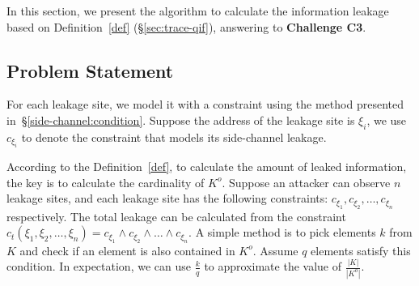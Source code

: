 

\newcommand{\addr}[1]{{l}_{#1}}
\renewcommand{\addr}[1]{{\gamma}_{#1}}
\renewcommand{\addr}[1]{{\zeta}_{#1}}
\renewcommand{\addr}[1]{{\xi}_{#1}}

In this section, we present the algorithm to calculate the information leakage
based on Definition~\ref{def} (\S\ref{sec:trace-qif}), answering to
\textbf{Challenge C3}.

\subsection{Problem Statement}
For each leakage site, we model it with a constraint using the
method presented in~\S\ref{side-channel:condition}. Suppose the address of the
leakage site is $\addr{i}$, we use $c_{\addr{i}}$ to denote the constraint
that models its side-channel leakage. 

According to the Definition~\ref{def}, to calculate the amount of leaked
information, the key is to calculate the cardinality
of $K^o$. Suppose an attacker can observe $n$ leakage sites, and each leakage
site has the following constraints: $c_{\addr{1}}, c_{\addr{2}}, \ldots,
c_{\addr{n}}$ respectively. The total leakage can be calculated from the constraint
$c_t({\addr{1}},{\addr{2}},\ldots,{\addr{n}}) = c_{\addr{1}} \land c_{\addr{2}}
\land \ldots \land c_{\addr{n}}$. 
A simple method is to pick elements $k$ from $K$ and check if an
element is also contained in $K^o$. Assume $q$ elements satisfy this condition. In
expectation, we can use $\frac{k}{q}$ to approximate the value of
$\frac{|K|}{|K^o|}$.

